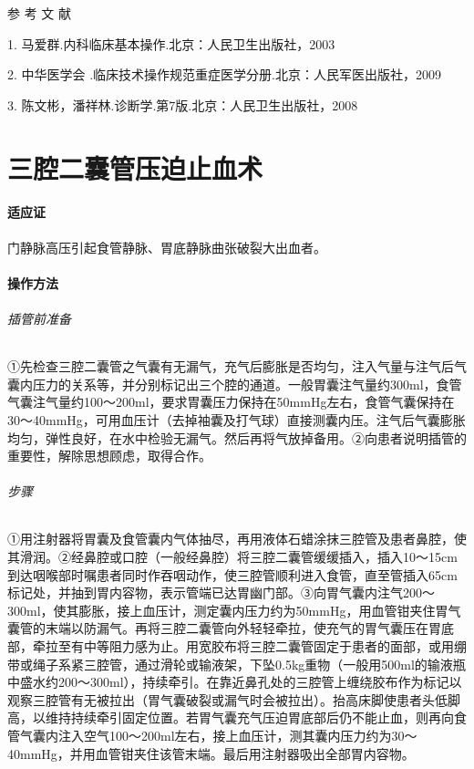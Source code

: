\hypertarget{text00385.htmlux5cux23CHP16-7-9}{}
参 考 文 献

1. 马爱群.内科临床基本操作.北京：人民卫生出版社，2003

2. 中华医学会 .临床技术操作规范重症医学分册.北京：人民军医出版社，2009

3. 陈文彬，潘祥林.诊断学.第7版.北京：人民卫生出版社，2008

\protect\hypertarget{text00386.html}{}{}

\chapter{三腔二囊管压迫止血术}

\subsubsection{适应证}

门静脉高压引起食管静脉、胃底静脉曲张破裂大出血者。

\subsubsection{操作方法}

\subparagraph{插管前准备}

①先检查三腔二囊管之气囊有无漏气，充气后膨胀是否均匀，注入气量与注气后气囊内压力的关系等，并分别标记出三个腔的通道。一般胃囊注气量约300ml，食管气囊注气量约100～200ml，要求胃囊压力保持在50mmHg左右，食管气囊保持在30～40mmHg，可用血压计（去掉袖囊及打气球）直接测囊内压。注气后气囊膨胀均匀，弹性良好，在水中检验无漏气。然后再将气放掉备用。②向患者说明插管的重要性，解除思想顾虑，取得合作。

\subparagraph{步骤}

①用注射器将胃囊及食管囊内气体抽尽，再用液体石蜡涂抹三腔管及患者鼻腔，使其滑润。②经鼻腔或口腔（一般经鼻腔）将三腔二囊管缓缓插入，插入10～15cm到达咽喉部时嘱患者同时作吞咽动作，使三腔管顺利进入食管，直至管插入65cm标记处，并抽到胃内容物，表示管端已达胃幽门部。③向胃气囊内注气200～300ml，使其膨胀，接上血压计，测定囊内压力约为50mmHg，用血管钳夹住胃气囊管的末端以防漏气。再将三腔二囊管向外轻轻牵拉，使充气的胃气囊压在胃底部，牵拉至有中等阻力感为止。用宽胶布将三腔二囊管固定于患者的面部，或用绷带或绳子系紧三腔管，通过滑轮或输液架，下坠0.5kg重物（一般用500ml的输液瓶中盛水约200～300ml），持续牵引。在靠近鼻孔处的三腔管上缠绕胶布作为标记以观察三腔管有无被拉出（胃气囊破裂或漏气时会被拉出）。抬高床脚使患者头低脚高，以维持持续牵引固定位置。若胃气囊充气压迫胃底部后仍不能止血，则再向食管气囊内注入空气100～200ml左右，接上血压计，测其囊内压力约为30～40mmHg，并用血管钳夹住该管末端。最后用注射器吸出全部胃内容物。

